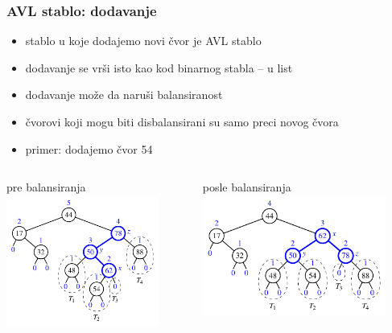\documentclass[compress]{beamer}
\begin{document}
\begin{frame}[fragile]
  \frametitle{AVL stablo: dodavanje}
  \begin{itemize}
    \item stablo u koje dodajemo novi čvor je AVL stablo
    \item dodavanje se vrši isto kao kod binarnog stabla -- u list
    \item dodavanje može da naruši balansiranost
    \item čvorovi koji mogu biti disbalansirani su samo preci novog čvora
    \item primer: dodajemo čvor 54
  \end{itemize}
  \begin{columns}
    \begin{column}[t]{6cm}
      \begin{center}
        pre balansiranja 
        \includegraphics[width=5cm]{asp-11-pic15a.pdf}
      \end{center}
    \end{column}  
    \begin{column}[t]{6cm}
      \begin{center}
        posle balansiranja
        \includegraphics[width=6cm]{asp-11-pic15b.pdf}
      \end{center}
    \end{column}  
  \end{columns}
\end{frame}
\end{document}
